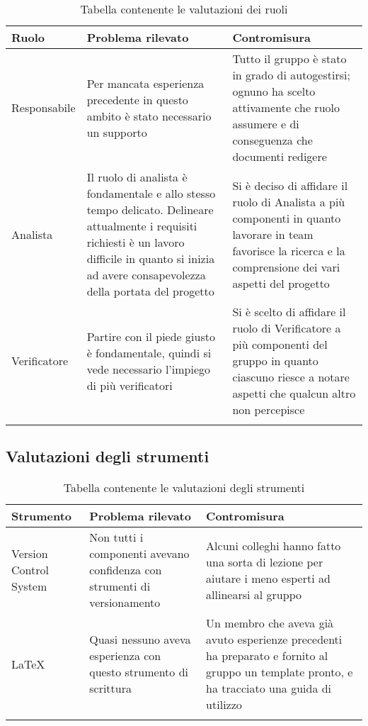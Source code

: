 \documentclass[../piano_di_qualifica.tex]{subfiles}
\begin{document}
\begin{center}
\begin{longtable}{|p{3cm}|p{4.5cm}|p{4.5cm}|}
		\hline
		\rowcolor{lightgray}
            \textbf{Ruolo} & \textbf{Problema rilevato} &  \textbf{Contromisura} \\
            \hline 
            Responsabile &
            Per mancata esperienza precedente in questo ambito è stato necessario un supporto  &
            Tutto il gruppo è stato in grado di autogestirsi; ognuno ha scelto attivamente che ruolo assumere e di conseguenza che documenti redigere\\
            \hline
            Analista & 
            Il ruolo di analista è fondamentale e allo stesso tempo delicato. Delineare attualmente i requisiti richiesti è un lavoro difficile in quanto si inizia ad avere consapevolezza della portata del progetto &
            Si è deciso di affidare il ruolo di Analista a più componenti in quanto lavorare in team favorisce la ricerca e la comprensione dei vari aspetti del progetto \\
            \hline
            Verificatore &
            Partire con il piede giusto è fondamentale, quindi si vede necessario l'impiego di più verificatori &
            Si è scelto di affidare il ruolo di Verificatore a più componenti del gruppo in quanto ciascuno riesce a notare aspetti che qualcun altro non percepisce \\
            \hline

\caption{Tabella contenente le valutazioni dei ruoli }
\end{longtable}
\end{center}

\subsection{Valutazioni degli strumenti}
\label{sub:valut_strumenti}

\begin{center}
	\begin{longtable}{|p{3cm}|p{4.5cm}|p{4.5cm}|}
		\hline
		\rowcolor{lightgray}
            \textbf{Strumento} & \textbf{Problema rilevato} &  \textbf{Contromisura} \\
            \hline 
            Version Control System & 
            Non tutti i componenti avevano confidenza con strumenti di versionamento &
            Alcuni colleghi hanno fatto una sorta di lezione per aiutare i meno esperti ad allinearsi al gruppo \\
            \hline
            \LaTeX &
            Quasi nessuno aveva esperienza con questo strumento di scrittura &
            Un membro che aveva già avuto esperienze precedenti ha preparato e fornito al gruppo un template pronto, e ha tracciato una 
            guida di utilizzo \\
            \hline

\caption{Tabella contenente le valutazioni degli strumenti}
\end{longtable}
\end{center}
\end{document}
